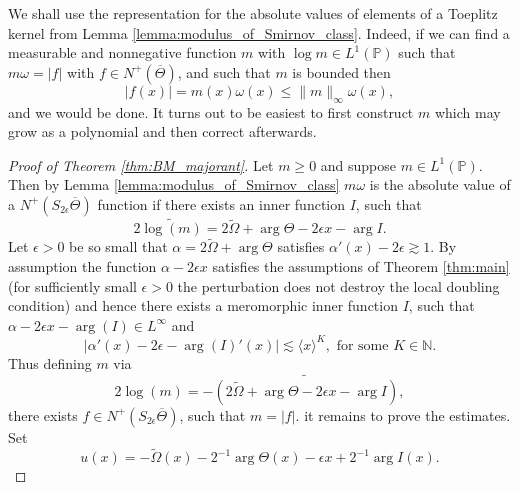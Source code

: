 \documentclass{article}[12pt]
\newcommand{\norm}[1]{\lVert#1\rVert}
\theoremstyle{remark}
\begin{document}
    We shall use the representation for the absolute values of elements of a Toeplitz kernel from Lemma \ref{lemma:modulus_of_Smirnov_class}. Indeed, if we can find a measurable and nonnegative function $m$ with $\log m \in L^{1}(\mathbb{P})$ such that $m \omega = \lvert f\rvert$ with $f \in N^{+}(\overline{\Theta})$, and such that $m$ is bounded then
    \begin{equation*}
        \lvert f(x) \rvert = m(x)\omega(x) \leq \norm{m}_{\infty}\omega(x),
    \end{equation*}
    and we would be done. It turns out to be easiest to first construct $m$ which may grow as a polynomial and then correct afterwards.

    \begin{proof}[Proof of Theorem \ref{thm:BM_majorant}]
        Let $m \geq 0$ and suppose $m \in L^{1}(\mathbb{P})$. Then by Lemma \ref{lemma:modulus_of_Smirnov_class} $m\omega$ is the absolute value of a $N^{+}(S_{2\epsilon}\overline{\Theta})$ function if there exists an inner function $I$, such that
        \begin{equation*}
            2\widetilde{\log(m)} = 2\widetilde{\Omega} + \arg \Theta -2\epsilon x- \arg I.
        \end{equation*}
        Let $\epsilon > 0$ be so small that $\alpha = 2\widetilde{\Omega} + \arg \Theta$ satisfies $\alpha'(x) - 2\epsilon \gtrsim 1$. By assumption the function $\alpha - 2\epsilon x$ satisfies the assumptions of Theorem \ref{thm:main} (for sufficiently small $\epsilon > 0$ the perturbation does not destroy the local doubling condition) and hence there exists a meromorphic inner function $I$, such that $\alpha-2\epsilon x- \arg(I) \in L^{\infty}$ and
        \begin{equation*}
            \lvert \alpha'(x)-2\epsilon - \arg(I)'(x) \rvert \lesssim \langle x \rangle^{K}, \text{ for some } K \in \mathbb{N}.
        \end{equation*}
        Thus defining $m$ via
        \begin{equation*}
            2\log(m) = -\widetilde{\left( 2\widetilde{\Omega} + \arg \Theta-2\epsilon x - \arg I\right)},
        \end{equation*}
        there exists $f \in N^{+}(S_{2\epsilon}\overline{\Theta})$, such that $m = \lvert f \rvert$. it remains to prove the estimates. Set
        \begin{equation*}
            u(x) = -\widetilde{\Omega}(x) - 2^{-1}\arg \Theta(x)-\epsilon x + 2^{-1}\arg I(x).
        \end{equation*}

\end{proof}
\end{document}
